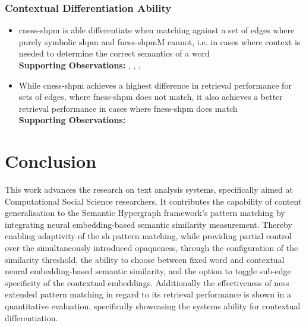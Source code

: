 \documentclass[11pt, numbers=noenddot]{scrreprt}
\begin{document}
\subsection{Contextual Differentiation Ability}
\label{sec:result-contextual-differentiation-ability}

\begin{itemize}
	\item \gls{cness-shpm} is able differentiate when matching against a set of edges where purely symbolic \gls{shpm} and \gls{fness-shpm}M cannot, i.e. in cases where context is needed to determine the correct semantics of a word \\
	\textbf{Supporting Observations:} , , , 
	
	\item While \gls{cness-shpm} achieves a highest difference in retrieval performance for sets of edges, where \gls{fness-shpm} does not match, it also achieves a better retrieval performance in cases where \gls{fness-shpm} does match \\
	\textbf{Supporting Observations:}  
		
\end{itemize}

\chapter{Conclusion}
\label{cha:conclusion}
This work advances the research on text analysis systems, specifically aimed at Computational Social Science researchers. It contributes the capability of content generalisation to the Semantic Hypergraph framework's pattern matching by integrating neural embedding-based semantic similarity measurement. Thereby enabling adaptivity of the \gls{sh} pattern matching, while providing partial control over the simultaneously introduced opaqueness, through the configuration of the similarity threshold, the ability to choose between fixed word and contextual neural embedding-based semantic similarity, and the option to toggle sub-edge specificity of the contextual embeddings. Additionally the effectiveness of \gls{ness} extended pattern matching in regard to its retrieval performance is shown in a quantitative evaluation, specifically showcasing the systems ability for contextual differentiation.
\end{document}
